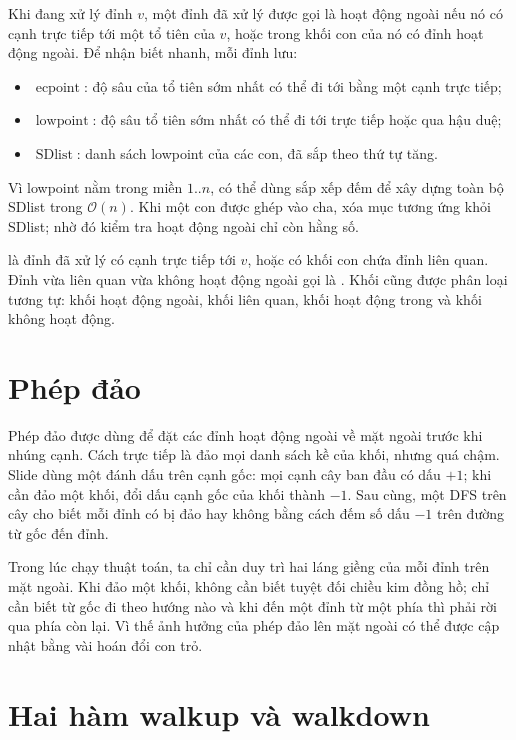 \documentclass[11pt]{article}
\newcommand{\Oh}{\mathcal{O}}
\begin{document}
Khi đang xử lý đỉnh \(v\), một đỉnh đã xử lý được gọi là hoạt động ngoài nếu
nó có cạnh trực tiếp tới một tổ tiên của \(v\), hoặc trong khối con của nó
có đỉnh hoạt động ngoài. Để nhận biết nhanh, mỗi đỉnh lưu:
\begin{itemize}
  \item \(\operatorname{ecpoint}\): độ sâu của tổ tiên sớm nhất có thể đi tới
  bằng một cạnh trực tiếp;
  \item \(\operatorname{lowpoint}\): độ sâu tổ tiên sớm nhất có thể đi tới
  trực tiếp hoặc qua hậu duệ;
  \item \(\operatorname{SDlist}\): danh sách lowpoint của các con, đã sắp theo
  thứ tự tăng.
\end{itemize}
Vì lowpoint nằm trong miền \(1..n\), có thể dùng sắp xếp đếm để xây dựng toàn
bộ SDlist trong \(\Oh(n)\). Khi một con được ghép vào cha, xóa mục tương ứng
khỏi SDlist; nhờ đó kiểm tra hoạt động ngoài chỉ còn hằng số.

 là đỉnh đã xử lý có cạnh trực tiếp tới \(v\), hoặc có
khối con chứa đỉnh liên quan. Đỉnh vừa liên quan vừa không hoạt động ngoài
gọi là . Khối cũng được phân loại tương tự: khối hoạt
động ngoài, khối liên quan, khối hoạt động trong và khối không hoạt động.

\section{Phép đảo}

Phép đảo được dùng để đặt các đỉnh hoạt động ngoài về mặt ngoài trước khi
nhúng cạnh. Cách trực tiếp là đảo mọi danh sách kề của khối, nhưng quá chậm.
Slide dùng một đánh dấu trên cạnh gốc: mọi cạnh cây ban đầu có dấu \(+1\);
khi cần đảo một khối, đổi dấu cạnh gốc của khối thành \(-1\). Sau cùng, một
DFS trên cây cho biết mỗi đỉnh có bị đảo hay không bằng cách đếm số dấu
\(-1\) trên đường từ gốc đến đỉnh.

Trong lúc chạy thuật toán, ta chỉ cần duy trì hai láng giềng của mỗi đỉnh
trên mặt ngoài. Khi đảo một khối, không cần biết tuyệt đối chiều kim đồng hồ;
chỉ cần biết từ gốc đi theo hướng nào và khi đến một đỉnh từ một phía thì
phải rời qua phía còn lại. Vì thế ảnh hưởng của phép đảo lên mặt ngoài có thể
được cập nhật bằng vài hoán đổi con trỏ.

\section{Hai hàm walkup và walkdown}
\end{document}
